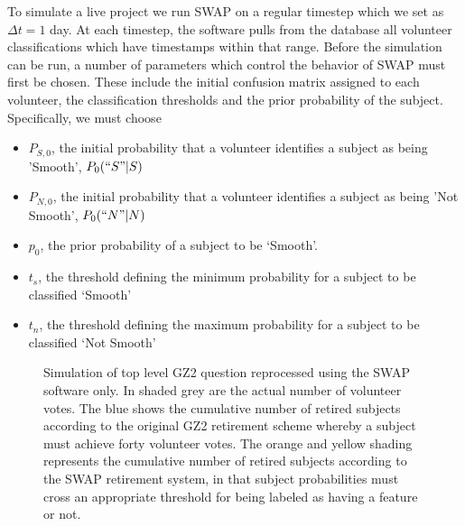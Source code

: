 \documentclass[twocolumn]{aastex6}
\newcommand{\Ps}{$P_{S,0}$}
\newcommand{\Pn}{$P_{N,0}$}
\newcommand{\ts}{$t_s$}
\newcommand{\tn}{$t_n$}
\begin{document}
To simulate a live project we run SWAP on a regular timestep which we set as $\Delta t = 1$ day. 
At each timestep, the software pulls from the database all volunteer classifications which
have timestamps within that range. Before the simulation can be run, a number 
of parameters which control the behavior of SWAP must first be chosen. These include
 the initial confusion matrix assigned to each volunteer, the classification
thresholds and the prior probability of the subject. Specifically, we must choose 
\begin{itemize}
\item \Ps, the initial probability that a volunteer identifies a subject as being 'Smooth', $P_0(``S"|S)$
\item \Pn, the initial probability that a volunteer identifies a subject as being 'Not Smooth', $P_0(``N"|N)$
\item $p_0$, the prior probability of a subject to be `Smooth'.
\item \ts, the threshold defining the minimum probability for a subject to be classified `Smooth'
\item \tn, the threshold defining the maximum probability for a subject to be classified `Not Smooth'
\end{itemize}


\begin{figure}[ht!]
\caption{Simulation of top level GZ2 question reprocessed using the SWAP software only. In shaded grey are the actual number of volunteer votes. The blue shows the cumulative number of retired subjects according to the original GZ2 retirement scheme whereby a subject must achieve forty volunteer votes. The orange and yellow shading represents the cumulative number of retired subjects according to the SWAP retirement system, in that subject probabilities must cross an appropriate threshold for being labeled as having a feature or not. \label{fig:swapresults}}
\end{figure}
\end{document}
